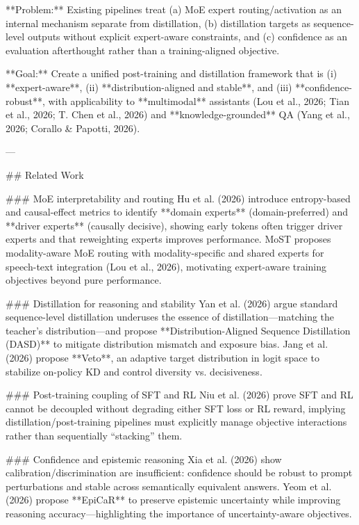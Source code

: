 **Problem:** Existing pipelines treat (a) MoE expert routing/activation as an internal mechanism separate from distillation, (b) distillation targets as sequence-level outputs without explicit expert-aware constraints, and (c) confidence as an evaluation afterthought rather than a training-aligned objective.  

**Goal:** Create a unified post-training and distillation framework that is (i) **expert-aware**, (ii) **distribution-aligned and stable**, and (iii) **confidence-robust**, with applicability to **multimodal** assistants (Lou et al., 2026; Tian et al., 2026; T. Chen et al., 2026) and **knowledge-grounded** QA (Yang et al., 2026; Corallo & Papotti, 2026).  

---

## Related Work  

### MoE interpretability and routing  
Hu et al. (2026) introduce entropy-based and causal-effect metrics to identify **domain experts** (domain-preferred) and **driver experts** (causally decisive), showing early tokens often trigger driver experts and that reweighting experts improves performance. MoST proposes modality-aware MoE routing with modality-specific and shared experts for speech-text integration (Lou et al., 2026), motivating expert-aware training objectives beyond pure performance.

### Distillation for reasoning and stability  
Yan et al. (2026) argue standard sequence-level distillation underuses the essence of distillation—matching the teacher’s distribution—and propose **Distribution-Aligned Sequence Distillation (DASD)** to mitigate distribution mismatch and exposure bias. Jang et al. (2026) propose **Veto**, an adaptive target distribution in logit space to stabilize on-policy KD and control diversity vs. decisiveness.

### Post-training coupling of SFT and RL  
Niu et al. (2026) prove SFT and RL cannot be decoupled without degrading either SFT loss or RL reward, implying distillation/post-training pipelines must explicitly manage objective interactions rather than sequentially “stacking” them.

### Confidence and epistemic reasoning  
Xia et al. (2026) show calibration/discrimination are insufficient: confidence should be robust to prompt perturbations and stable across semantically equivalent answers. Yeom et al. (2026) propose **EpiCaR** to preserve epistemic uncertainty while improving reasoning accuracy—highlighting the importance of uncertainty-aware objectives.


